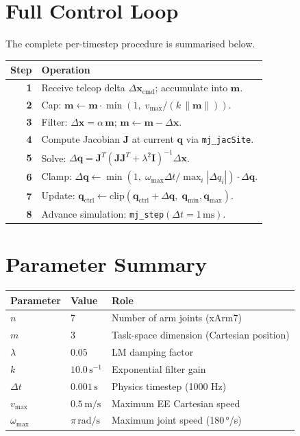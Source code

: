 \documentclass[11pt, a4paper]{article}
\begin{document}
\section{Full Control Loop}

The complete per-timestep procedure is summarised below.

\begin{center}
\renewcommand{\arraystretch}{1.4}
\begin{tabular}{>{\bfseries}r l}
\toprule
Step & Operation \\
\midrule
1 & Receive teleop delta $\Delta\mathbf{x}_{\text{cmd}}$; accumulate into $\mathbf{m}$. \\
2 & Cap: $\mathbf{m} \leftarrow \mathbf{m}\cdot\min\!\left(1,\; v_{\max}/\left(k\,\|\mathbf{m}\|\right)\right)$. \\
3 & Filter: $\Delta\mathbf{x} = \alpha\,\mathbf{m}$;\; $\mathbf{m} \leftarrow \mathbf{m} - \Delta\mathbf{x}$. \\
4 & Compute Jacobian $\mathbf{J}$ at current $\mathbf{q}$ via \texttt{mj\_jacSite}. \\
5 & Solve: $\Delta\mathbf{q} = \mathbf{J}^T\!\left(\mathbf{J}\mathbf{J}^T + \lambda^2\mathbf{I}\right)^{-1}\Delta\mathbf{x}$. \\
6 & Clamp: $\Delta\mathbf{q} \leftarrow \min\!\left(1,\; \omega_{\max}\Delta t / \max_i|\Delta q_i|\right)\cdot\Delta\mathbf{q}$. \\
7 & Update: $\mathbf{q}_{\text{ctrl}} \leftarrow \text{clip}\!\left(\mathbf{q}_{\text{ctrl}} + \Delta\mathbf{q},\; \mathbf{q}_{\min}, \mathbf{q}_{\max}\right)$. \\
8 & Advance simulation: \texttt{mj\_step}$(\Delta t = 1\,\text{ms})$. \\
\bottomrule
\end{tabular}
\end{center}

\section{Parameter Summary}

\begin{center}
\renewcommand{\arraystretch}{1.3}
\begin{tabular}{lll}
\toprule
Parameter & Value & Role \\
\midrule
$n$ & 7 & Number of arm joints (xArm7) \\
$m$ & 3 & Task-space dimension (Cartesian position) \\
$\lambda$ & $0.05$ & LM damping factor \\
$k$ & $10.0\,\text{s}^{-1}$ & Exponential filter gain \\
$\Delta t$ & $0.001\,\text{s}$ & Physics timestep (1000 Hz) \\
$v_{\max}$ & $0.5\,\text{m/s}$ & Maximum EE Cartesian speed \\
$\omega_{\max}$ & $\pi\,\text{rad/s}$ & Maximum joint speed (180\,°/s) \\
\bottomrule
\end{tabular}
\end{center}
\end{document}
